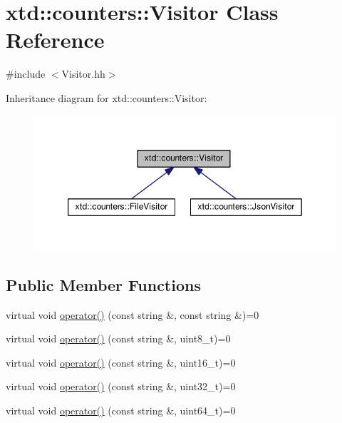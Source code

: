\hypertarget{classxtd_1_1counters_1_1Visitor}{\section{xtd\-:\-:counters\-:\-:Visitor Class Reference}
\label{classxtd_1_1counters_1_1Visitor}
}


{\ttfamily \#include $<$Visitor.\-hh$>$}



Inheritance diagram for xtd\-:\-:counters\-:\-:Visitor\-:
\nopagebreak
\begin{figure}[H]
\begin{center}
\leavevmode
\includegraphics[width=349pt]{classxtd_1_1counters_1_1Visitor__inherit__graph}
\end{center}
\end{figure}
\subsection*{Public Member Functions}
\begin{DoxyCompactItemize}
\item 
virtual void \hyperlink{classxtd_1_1counters_1_1Visitor_a1341281b8c4cbf4de5a37e035f75e214}{operator()} (const string \&, const string \&)=0
\item 
virtual void \hyperlink{classxtd_1_1counters_1_1Visitor_a1a5da2c523703b0c9132595f22e1700e}{operator()} (const string \&, uint8\-\_\-t)=0
\item 
virtual void \hyperlink{classxtd_1_1counters_1_1Visitor_a6139d735b720a83e87f49932855f1ade}{operator()} (const string \&, uint16\-\_\-t)=0
\item 
virtual void \hyperlink{classxtd_1_1counters_1_1Visitor_a0bc4c30e3df6ef796878b85ce1be17fb}{operator()} (const string \&, uint32\-\_\-t)=0
\item 
virtual void \hyperlink{classxtd_1_1counters_1_1Visitor_aba895c10dd1a28fa7a8b64e61adee5ac}{operator()} (const string \&, uint64\-\_\-t)=0
\end{DoxyCompactItemize}


